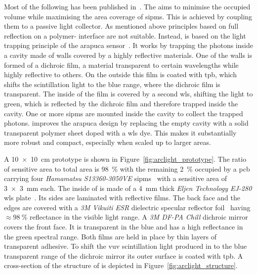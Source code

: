Most of the following has been published in~\cite{arclight}.
The \AL{} aims to minimise the occupied volume while maximising the area coverage of \glspl{sipm}.
This is achieved by coupling them to a passive light collector.
As mentioned above principles based on full reflection on a polymer-\lar{} interface are not suitable.
Instead, \AL{} is based on the light trapping principle of the \gls{arapuca} sensor~\cite{arapuca}.
It works by trapping the photons inside a cavity made of walls covered by a highly reflective materials.
One of the walls is formed of a dichroic film, a material transparent to certain wavelengths while highly reflective to others.
On the outside this film is coated with \gls{tpb}, which shifts the \lar{} scintillation light to the blue range, where the dichroic film is transparent.
The inside of the film is covered by a second \gls{wls}, shifting the light to green, which is reflected by the dichroic film and therefore trapped inside the cavity.
One or more \glspl{sipm} are mounted inside the cavity to collect the trapped photons.
\AL{} improves the \gls{arapuca} design by replacing the empty cavity with a solid transparent polymer sheet doped with a \gls{wls} dye.
This makes it substantially more robust and compact, especially when scaled up to larger areas.

A \SI{10 x 10}{\centi\metre} \AL{} prototype is shown in Figure~\ref{fig:arclight_prototype}.
The ratio of sensitive area to total area is \SI{98}{\percent} with the remaining \SI{2}{\percent} occupied by a \gls{pcb} carrying four \emph{Hamamatsu S13360-3050VE} \glspl{sipm}~\cite{arclight_sipm} with a sensitive area of \SI{3 x 3}{\milli\metre} each.
The inside of \AL{} is made of a \SI{4}{\milli\metre} thick \emph{Eljen Technology EJ-280} \gls{wls} plate~\cite{arclight_wls}.
Its sides are laminated with reflective films.
The back face and the edges are covered with a \emph{3M Vikuiti ESR} dielectric specular reflector foil~\cite{arclight_esr} having $\approx \SI{98}{\percent}$ reflectance in the visible light range.
A \emph{3M DF-PA Chill} dichroic mirror~\cite{arclight_dichroic} covers the front face.
It is transparent in the blue and has a high reflectance in the green spectral range.
Both films are held in place by thin layers of transparent adhesive.
To shift the \gls{vuv} scintillation light produced in \lar{} to the blue transparent range of the dichroic mirror its outer surface is coated with \gls{tpb}.
A cross-section of the structure of \AL{} is depicted in Figure~\ref{fig:arclight_structure}.

